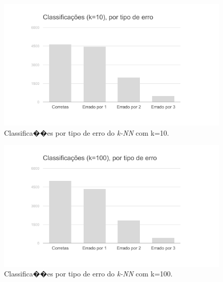 \documentclass[12pt]{article}
\begin{document}
\begin{figure}[H]
\centering\includegraphics[width=.65\linewidth]{graf-white10.png}
\caption{Classifica��es por tipo de erro do \emph{k-NN} com k=10.}
\label{fig:graf10}
\end{figure}

\begin{figure}[H]
\centering\includegraphics[width=.65\linewidth]{graf-white100.png}
\caption{Classifica��es por tipo de erro do \emph{k-NN} com k=100.}
\label{fig:graf100}
\end{figure}
\end{document}
